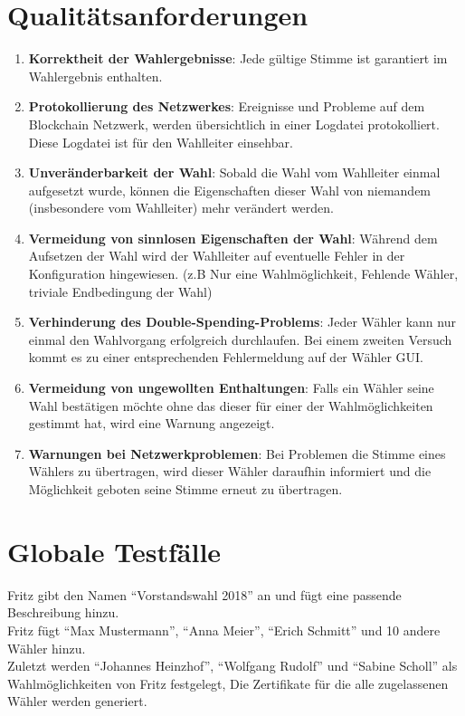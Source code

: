 \documentclass[parskip=full,11pt,twoside]{scrartcl}
\begin{document}
\section{Qualitätsanforderungen}
\begin{enumerate}
	\item \textbf{Korrektheit der Wahlergebnisse}: Jede gültige Stimme ist garantiert im Wahlergebnis enthalten.
	\item \textbf{Protokollierung des Netzwerkes}: Ereignisse und Probleme auf dem Blockchain Netzwerk, werden übersichtlich in einer Logdatei protokolliert. Diese Logdatei ist für den Wahlleiter einsehbar.
	\item \textbf{Unveränderbarkeit der Wahl}: Sobald die Wahl vom Wahlleiter einmal aufgesetzt wurde, können die Eigenschaften dieser Wahl von niemandem (insbesondere vom Wahlleiter) mehr verändert werden.
	\item \textbf{Vermeidung von sinnlosen Eigenschaften der Wahl}: Während dem Aufsetzen der Wahl wird der Wahlleiter auf eventuelle Fehler in der Konfiguration hingewiesen. (z.B Nur eine Wahlmöglichkeit, Fehlende Wähler, triviale Endbedingung der Wahl)
	\item \textbf{Verhinderung des Double-Spending-Problems}: Jeder Wähler kann nur einmal den Wahlvorgang erfolgreich durchlaufen. Bei einem zweiten Versuch kommt es zu einer entsprechenden Fehlermeldung auf der Wähler GUI.
	\item \textbf{Vermeidung von ungewollten Enthaltungen}: Falls ein Wähler seine Wahl bestätigen möchte ohne das dieser für einer der Wahlmöglichkeiten gestimmt hat, wird eine Warnung angezeigt.
	\item \textbf{Warnungen bei Netzwerkproblemen}: Bei Problemen die Stimme eines Wählers zu übertragen, wird dieser Wähler daraufhin informiert und die Möglichkeit geboten seine Stimme erneut zu übertragen. 
\end{enumerate}

\section{Globale Testfälle}

		{Fritz gibt den Namen \enquote{Vorstandswahl 2018} an und fügt eine passende Beschreibung hinzu.\\
		Fritz fügt \enquote{Max Mustermann}, \enquote{Anna Meier}, \enquote{Erich Schmitt} und 10 andere Wähler hinzu.\\
		Zuletzt werden \enquote{Johannes Heinzhof}, \enquote{Wolfgang Rudolf} und \enquote{Sabine Scholl} als Wahlmöglichkeiten von Fritz festgelegt,}
		{Die Zertifikate für die alle zugelassenen Wähler werden generiert.}
		
\end{document}
